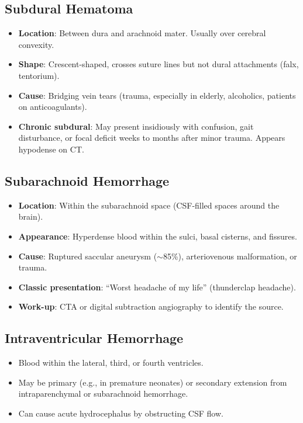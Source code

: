 \subsection{Subdural Hematoma}
\begin{itemize}
  \item \textbf{Location}: Between dura and arachnoid mater. Usually over cerebral convexity.
  \item \textbf{Shape}: Crescent-shaped, crosses suture lines but not dural attachments (falx, tentorium).
  \item \textbf{Cause}: Bridging vein tears (trauma, especially in elderly, alcoholics, patients on anticoagulants).
  \item \textbf{Chronic subdural}: May present insidiously with confusion, gait disturbance, or focal deficit weeks to months after minor trauma. Appears hypodense on CT.
\end{itemize}

\subsection{Subarachnoid Hemorrhage}
\begin{itemize}
  \item \textbf{Location}: Within the subarachnoid space (CSF-filled spaces around the brain).
  \item \textbf{Appearance}: Hyperdense blood within the sulci, basal cisterns, and fissures.
  \item \textbf{Cause}: Ruptured saccular aneurysm ($\sim$85\%), arteriovenous malformation, or trauma.
  \item \textbf{Classic presentation}: ``Worst headache of my life'' (thunderclap headache).
  \item \textbf{Work-up}: CTA or digital subtraction angiography to identify the source.
\end{itemize}

\subsection{Intraventricular Hemorrhage}
\begin{itemize}
  \item Blood within the lateral, third, or fourth ventricles.
  \item May be primary (e.g., in premature neonates) or secondary extension from intraparenchymal or subarachnoid hemorrhage.
  \item Can cause acute hydrocephalus by obstructing CSF flow.
\end{itemize}


